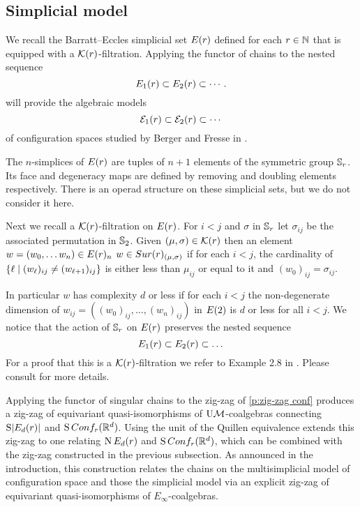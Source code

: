 
\subsection{Simplicial model}\label{ss:simplicial model}

We recall the Barratt--Eccles simplicial set $E(r)$ defined for each $r\in\mathbb{N}$ that is equipped with a $\mathcal{K}(r)$-filtration.
Applying the functor of chains to the nested sequence
\[
E_{1}(r) \subset E_{2}(r) \subset \dotsb.
\]
will provide the algebraic models
\[
\mathcal{E}_{1}(r) \subset \mathcal{E}_{2}(r) \subset \dotsb
\]
of configuration spaces studied by Berger and Fresse in \cite{berger2004combinatorial}.

The $n$-simplices of $E(r)$ are tuples of $n+1$ elements of the symmetric group $\mathbb{S}_r$.
Its face and degeneracy maps are defined by removing and doubling elements respectively.
There is an operad structure on these simplicial sets, but we do not consider it here.

Next we recall a $\mathcal{K}(r)$-filtration on $E(r)$.
For $i<j$ and $\sigma$ in $\mathbb{S}_r$ let $\sigma_{ij}$ be the associated permutation in $\mathbb{S}_2$.
Given $(\mu,\sigma) \in \mathcal{K}(r)$ then an
element $w = (w_0,\dots w_n) \in E(r)_n$
$w \in Sur(r)_{(\mu,\sigma)}$ if for each $i<j$, the cardinality of $\{\ell \mid (w_{\ell})_{ij} \neq (w_{\ell+1})_{ij}\}$ is either less than $\mu_{ij}$ or equal to it and $(w_0)_{ij} = \sigma_{ij}$.

In particular $w$ has complexity $d$ or less if for each $i<j$
the non-degenerate dimension of $w_{ij}=((w_0)_{ij},\dots,(w_n)_{ij})$ in $E(2)$ is $d$ or less for all $i<j$.
We notice that the action of $\mathbb{S}_r$ on $E(r)$ preserves the nested sequence
$$E_1(r) \subset E_2(r) \subset \dots$$
For a proof that this is a $\mathcal{K}(r)$-filtration we refer to Example 2.8 in \cite{berger1997confspacemodel}.
Please consult \cite{smith1989filtration,kashiwabara1993confcomplex,berger1997confspacemodel} for more details.
 
Applying the functor of singular chains to the zig-zag of \cref{p:zig-zag conf} produces a zig-zag of equivariant quasi-isomorphisms of $\mathrm{U}\mathcal{M}$-coalgebras connecting $\operatorname{S}\lvert E_d(r)\rvert$ and $\operatorname{S}Conf_{r}(\mathbb{R}^{d})$.
Using the unit of the Quillen equivalence extends this zig-zag to one relating $\operatorname{N}E_d(r)$ and $\operatorname{S}Conf_{r}(\mathbb{R}^{d})$, which can be combined with the zig-zag constructed in the previous subsection.
As announced in the introduction, this construction relates the chains on the multisimplicial model of configuration space and those the simplicial model via an explicit zig-zag of equivariant quasi-isomorphisms of $E_\infty$-coalgebras.

